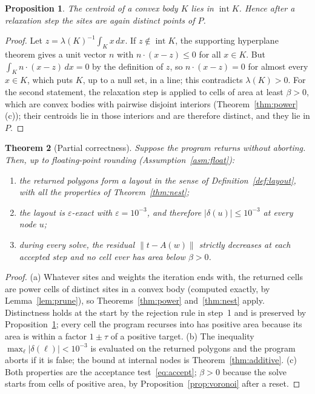 \documentclass[11pt,a4paper]{article}
\theoremstyle{plain}
\newtheorem{theorem}{Theorem}
\newtheorem{proposition}[theorem]{Proposition}
\theoremstyle{definition}
\theoremstyle{remark}
\newcommand{\area}{\lambda}
\newcommand{\norm}[1]{\lVert #1\rVert}
\newcommand{\interior}{\operatorname{int}}
\begin{document}
\begin{proposition}\label{prop:centroid}
The centroid of a convex body $K$ lies in $\interior K$. Hence after a
relaxation step the sites are again distinct points of $P$.
\end{proposition}
\begin{proof}
Let $z=\area(K)^{-1}\int_K x\,dx$. If $z\notin\interior K$, the supporting
hyperplane theorem gives a unit vector $n$ with $n\cdot(x-z)\le 0$ for all
$x\in K$. But $\int_K n\cdot(x-z)\,dx=0$ by the definition of $z$, so
$n\cdot(x-z)=0$ for almost every $x\in K$, which puts $K$, up to a null set,
in a line; this contradicts $\area(K)>0$. For the second statement, the
relaxation step is applied to cells of area at least $\beta>0$, which are
convex bodies with pairwise disjoint interiors
(Theorem~\ref{thm:power}(c)); their centroids lie in those interiors and are
therefore distinct, and they lie in $P$.
\end{proof}

\begin{theorem}[Partial correctness]\label{thm:partial}
Suppose the program returns without aborting. Then, up to floating-point
rounding (Assumption~\ref{asm:float}):
\begin{enumerate}[label=(\alph*)]
\item the returned polygons form a layout in the sense of
      Definition~\ref{def:layout}, with all the properties of
      Theorem~\ref{thm:nest};
\item the layout is $\varepsilon$-exact with $\varepsilon=10^{-3}$, and
      therefore $\lvert\delta(u)\rvert\le10^{-3}$ at every node $u$;
\item during every solve, the residual $\norm{t-A(w)}$ strictly decreases at
      each accepted step and no cell ever has area below $\beta>0$.
\end{enumerate}
\end{theorem}
\begin{proof}
(a) Whatever sites and weights the iteration ends with, the returned cells are
power cells of distinct sites in a convex body (computed exactly, by
Lemma~\ref{lem:prune}), so
Theorems~\ref{thm:power} and~\ref{thm:nest} apply. Distinctness holds at the
start by the rejection rule in step~1 and is preserved by
Proposition~\ref{prop:centroid}; every cell the program recurses into has
positive area because its area is within a factor $1\pm\tau$ of a positive
target.
(b) The inequality $\max_\ell\lvert\delta(\ell)\rvert<10^{-3}$ is evaluated on
the returned polygons and the program aborts if it is false; the bound at
internal nodes is Theorem~\ref{thm:additive}.
(c) Both properties are the acceptance test~\eqref{eq:accept}; $\beta>0$
because the solve starts from cells of positive area, by
Proposition~\ref{prop:voronoi} after a reset.
\end{proof}
\end{document}
